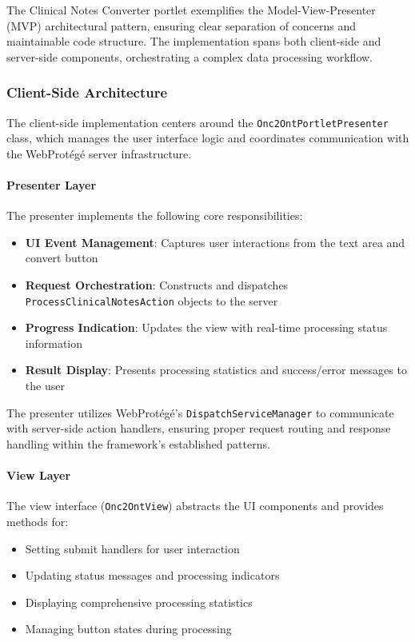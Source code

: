 The Clinical Notes Converter portlet exemplifies the Model-View-Presenter (MVP) architectural pattern, ensuring clear separation of concerns and maintainable code structure. The implementation spans both client-side and server-side components, orchestrating a complex data processing workflow.

\subsubsection{Client-Side Architecture}

The client-side implementation centers around the \texttt{Onc2OntPortletPresenter} class, which manages the user interface logic and coordinates communication with the WebProtégé server infrastructure.

\paragraph{Presenter Layer}
The presenter implements the following core responsibilities:

\begin{itemize}
\item \textbf{UI Event Management}: Captures user interactions from the text area and convert button
\item \textbf{Request Orchestration}: Constructs and dispatches \texttt{ProcessClinicalNotesAction} objects to the server
\item \textbf{Progress Indication}: Updates the view with real-time processing status information
\item \textbf{Result Display}: Presents processing statistics and success/error messages to the user
\end{itemize}

The presenter utilizes WebProtégé's \texttt{DispatchServiceManager} to communicate with server-side action handlers, ensuring proper request routing and response handling within the framework's established patterns.

\paragraph{View Layer}
The view interface (\texttt{Onc2OntView}) abstracts the UI components and provides methods for:

\begin{itemize}
\item Setting submit handlers for user interaction
\item Updating status messages and processing indicators
\item Displaying comprehensive processing statistics
\item Managing button states during processing
\end{itemize}


